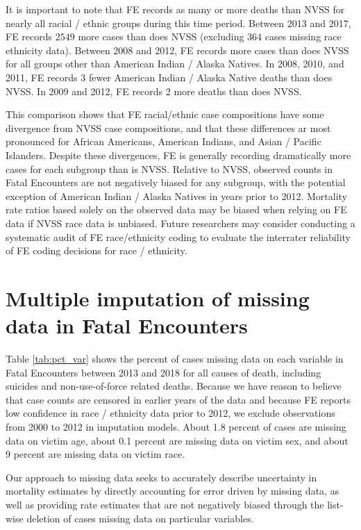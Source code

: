 \documentclass{article}
\begin{document}
It is important to note that FE records as many or more deaths than NVSS for nearly all racial / ethnic groups during this time period. Between 2013 and 2017, FE records $2549$ more cases than does NVSS (excluding $364$ cases missing race ethnicity data). Between 2008 and 2012, FE records more cases than does NVSS for all groups other than American Indian / Alaska Natives. In 2008, 2010, and 2011, FE records 3 fewer American Indian / Alaska Native deaths than does NVSS. In 2009 and 2012, FE records 2 more deaths than does NVSS. 

This comparison shows that FE racial/ethnic case compositions have some divergence from NVSS case compositions, and that these differences ar most pronounced for African Americans, American Indians, and Asian / Pacific Islanders. Despite these divergences, FE is generally recording dramatically more cases for each subgroup than is NVSS. Relative to NVSS, observed counts in Fatal Encounters are not negatively biased for any subgroup, with the potential exception of American Indian / Alaska Natives in years prior to 2012. Mortality rate ratios based solely on the observed data may be biased when relying on FE data if NVSS race data is unbiased. Future researchers may consider conducting a systematic audit of FE race/ethnicity coding to evaluate the interrater reliability of FE coding decisions for race / ethnicity. 

\section*{Multiple imputation of missing data in Fatal Encounters}

Table \ref{tab:pct_var} shows the percent of cases missing data on each variable in Fatal Encounters between 2013 and 2018 for all causes of death, including suicides and non-use-of-force related deaths. Because we have reason to believe that case counts are censored in earlier years of the data and because FE reports low confidence in race / ethnicity data prior to 2012, we exclude observations from 2000 to 2012 in imputation models. About 1.8 percent of cases are missing data on victim age, about 0.1 percent are missing data on victim sex, and about 9 percent are missing data on victim race. 

Our approach to missing data seeks to accurately describe uncertainty in mortality estimates by directly accounting for error driven by missing data, as well as providing rate estimates that are not negatively biased through the list-wise deletion of cases missing data on particular variables.
\end{document}

